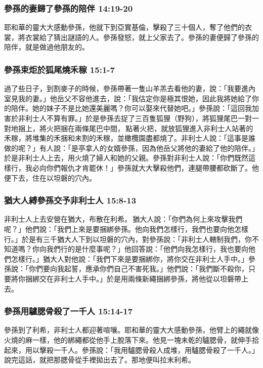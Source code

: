 \subsubsection{參孫的妻歸了參孫的陪伴 14:19-20}
耶和華的靈大大感動參孫，他就下到亞實基倫，擊殺了三十個人，奪了他們的衣裳，將衣裳給了猜出謎語的人。參孫發怒，就上父家去了。參孫的妻便歸了參孫的陪伴，就是做過他朋友的。

\subsubsection{參孫束炬於狐尾燒禾稼 15:1-7}
過了些日子，到割麥子的時候，參孫帶著一隻山羊羔去看他的妻，說：「我要進內室見我的妻。」他岳父不容他進去，說：「我估定你是極其恨她，因此我將她給了你的陪伴。她的妹子不是比她還美麗嗎？你可以娶來代替她吧。」參孫說：「這回我加害於非利士人不算有罪。」於是參孫去捉了三百隻狐狸（野狗），將狐狸尾巴一對一對地捆上，將火把捆在兩條尾巴中間， 點著火把，就放狐狸進入非利士人站著的禾稼，將堆集的禾捆和未割的禾稼，並橄欖園盡都燒了。非利士人說：「這事是誰做的呢？」有人說：「是亭拿人的女婿參孫，因為他岳父將他的妻給了他的陪伴。」於是非利士人上去，用火燒了婦人和她的父親。參孫對非利士人說：「你們既然這樣行，我必向你們報仇才肯罷休！」參孫就大大擊殺他們，連腿帶腰都砍斷了。他便下去，住在以坦磐的穴內。

\subsubsection{猶大人縛參孫交予非利士人 15:8-13}
非利士人上去安營在猶大，布散在利希。 猶大人說：「你們為何上來攻擊我們呢？」他們說：「我們上來是要捆綁參孫。他向我們怎樣行，我們也要向他怎樣行。」於是有三千猶大人下到以坦磐的穴內，對參孫說：「非利士人轄制我們，你不知道嗎？你向我們行的是什麼事呢？」他回答說：「他們向我怎樣行，我也要向他們怎樣行。」猶大人對他說：「我們下來是要捆綁你，將你交在非利士人手中。」參孫說：「你們要向我起誓，應承你們自己不害死我。」他們說：「我們斷不殺你，只要將你捆綁交在非利士人手中。」於是用兩條新繩捆綁參孫，將他從以坦磐帶上去。

\subsubsection{參孫用驢腮骨殺了一千人 15:14-17}
參孫到了利希，非利士人都迎著喧嚷。耶和華的靈大大感動參孫，他臂上的繩就像火燒的麻一樣，他的綁繩都從他手上脫落下來。他見一塊未乾的驢腮骨，就伸手拾起來，用以擊殺一千人。參孫說：「我用驢腮骨殺人成堆，用驢腮骨殺了一千人。」說完這話，就把那腮骨從手裡拋出去了。那地便叫拉末利希。

